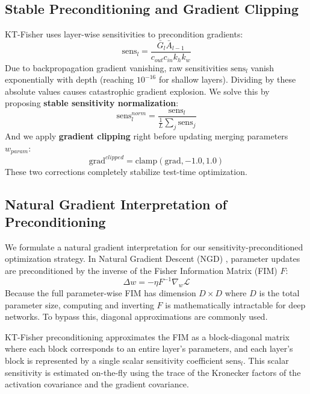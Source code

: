 \documentclass{article}
\begin{document}
\subsection{Stable Preconditioning and Gradient Clipping}
KT-Fisher \cite{kt_fisher25} uses layer-wise sensitivities to precondition gradients:
\begin{equation}
    \text{sens}_l = \frac{\bar{G}_l \bar{A}_{l-1}}{c_{out} c_{in} k_h k_w}
\end{equation}
Due to backpropagation gradient vanishing, raw sensitivities $\text{sens}_l$ vanish exponentially with depth (reaching $10^{-16}$ for shallow layers). Dividing by these absolute values causes catastrophic gradient explosion. We solve this by proposing \textbf{stable sensitivity normalization}:
\begin{equation}
    \text{sens}_l^{norm} = \frac{\text{sens}_l}{\frac{1}{L}\sum_j \text{sens}_j}
\end{equation}
And we apply \textbf{gradient clipping} right before updating merging parameters $w_{param}$:
\begin{equation}
    \text{grad}^{clipped} = \text{clamp}(\text{grad}, -1.0, 1.0)
\end{equation}
These two corrections completely stabilize test-time optimization.

\subsection{Natural Gradient Interpretation of Preconditioning}
We formulate a natural gradient interpretation for our sensitivity-preconditioned optimization strategy. In Natural Gradient Descent (NGD) \cite{ref_1, ref_2}, parameter updates are preconditioned by the inverse of the Fisher Information Matrix (FIM) $F$:
\begin{equation}
    \Delta w = -\eta F^{-1} \nabla_{w} \mathcal{L}
\end{equation}
Because the full parameter-wise FIM has dimension $D \times D$ where $D$ is the total parameter size, computing and inverting $F$ is mathematically intractable for deep networks. To bypass this, diagonal approximations are commonly used. 

KT-Fisher preconditioning approximates the FIM as a block-diagonal matrix where each block corresponds to an entire layer's parameters, and each layer's block is represented by a single scalar sensitivity coefficient $\text{sens}_l$. This scalar sensitivity is estimated on-the-fly using the trace of the Kronecker factors of the activation covariance and the gradient covariance. 
\end{document}
